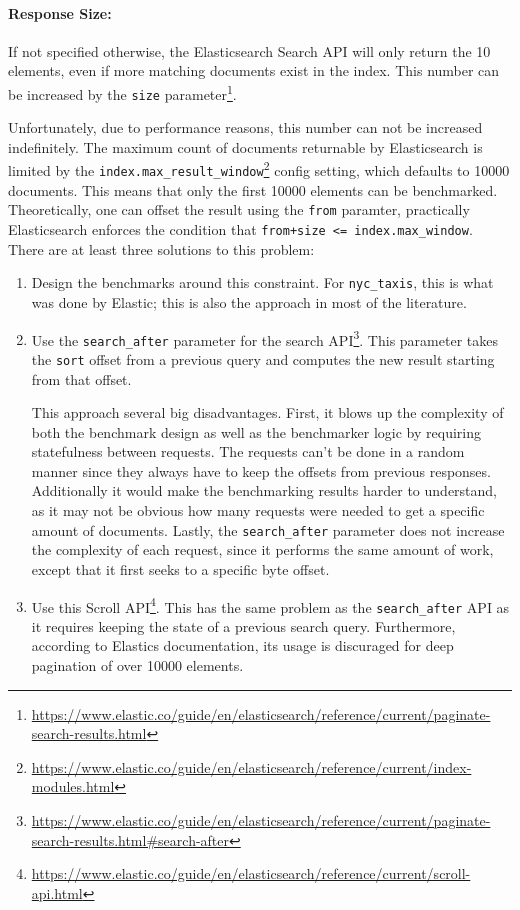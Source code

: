 \paragraph{Response Size:} If not specified otherwise, the Elasticsearch Search API will only return the 10 elements, even if more matching documents exist in the index. This number can be increased by the \texttt{size} parameter\footnote{\url{https://www.elastic.co/guide/en/elasticsearch/reference/current/paginate-search-results.html}}.

Unfortunately, due to performance reasons, this number can not be increased indefinitely. The maximum count of documents returnable by Elasticsearch is limited by the \texttt{index.max\_result\_window}\footnote{\url{https://www.elastic.co/guide/en/elasticsearch/reference/current/index-modules.html}} config setting, which defaults to 10000 documents. This means that only the first 10000 elements can be benchmarked. Theoretically, one can offset the result using the \texttt{from} paramter, practically Elasticsearch enforces the condition that \texttt{from+size <= index.max\_window}.\\

There are at least three solutions to this problem:
\begin{enumerate}
  \item Design the benchmarks around this constraint. For \texttt{nyc\_taxis}, this is what was done by Elastic; this is also the approach in most of the literature.
  \item Use the \texttt{search\_after} parameter for the search API\footnote{\url{https://www.elastic.co/guide/en/elasticsearch/reference/current/paginate-search-results.html\#search-after}}. This parameter takes the \texttt{sort} offset from a previous query and computes the new result starting from that offset.

    This approach several big disadvantages. First, it blows up the complexity of both the benchmark design as well as the benchmarker logic by requiring statefulness between requests. The requests can't be done in a random manner since they always have to keep the offsets from previous responses. Additionally it would make the benchmarking results harder to understand, as it may not be obvious how many requests were needed to get a specific amount of documents. Lastly, the \texttt{search\_after} parameter does not increase the complexity of each request, since it performs the same amount of work, except that it first seeks to a specific byte offset.

  \item Use this Scroll API\footnote{\url{https://www.elastic.co/guide/en/elasticsearch/reference/current/scroll-api.html}}. This has the same problem as the \texttt{search\_after} API as it requires keeping the state of a previous search query. Furthermore, according to Elastics documentation, its usage is discuraged for deep pagination of over 10000 elements.
\end{enumerate}

